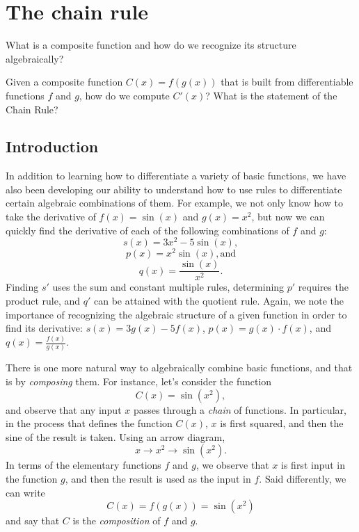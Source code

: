 \section{The chain rule} \label{S:2.6.Chain}

\begin{goals}
\item What is a composite function and how do we recognize its structure algebraically?
\item Given a composite function $C(x) = f(g(x))$ that is built from differentiable functions $f$ and $g$, how do we compute $C'(x)$?  What is the statement of the Chain Rule?
\end{goals}

\subsection*{Introduction}

In addition to learning how to differentiate a variety of basic functions, we have also been developing our ability to understand how to use rules to differentiate certain algebraic combinations of them.  For example, we not only know how to take the derivative of $f(x) = \sin(x)$ and $g(x) = x^2$, but now we can quickly find the derivative of each of the following combinations of $f$ and $g$:
$$s(x) = 3x^2 - 5\sin(x),$$
$$p(x) = x^2 \sin(x), \mbox{and}$$
$$q(x) = \frac{\sin(x)}{x^2}.$$
Finding $s'$ uses the sum and constant multiple rules, determining $p'$ requires the product rule, and $q'$ can be attained with the quotient rule.  Again, we note the importance of recognizing the algebraic structure of a given function in order to find its derivative:  $s(x) = 3g(x) - 5f(x)$, $p(x) = g(x) \cdot f(x)$, and $q(x) =\frac{f(x)}{g(x)}.$

There is one more natural way to algebraically combine basic functions, and that is by \emph{composing} them.  For instance, let's consider the function
$$C(x) = \sin(x^2),$$
and observe that any input $x$ passes through a \emph{chain} of functions.  In particular, in the process that defines the  function $C(x)$, $x$ is first squared, and then the sine of the result is taken.  Using an arrow diagram,
$$x \longrightarrow x^2 \longrightarrow \sin(x^2).$$
In terms of the elementary functions $f$ and $g$, we observe that $x$ is first input in the function $g$, and then the result is used as the input in $f$.  Said differently, we can write
$$C(x) = f(g(x)) = \sin(x^2)$$
and say that $C$ is the \emph{composition}  of $f$ and $g$.  %

